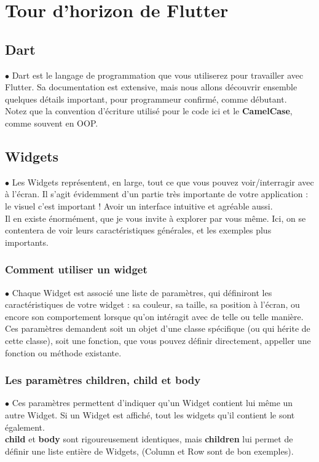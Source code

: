 \section{Tour d'horizon de Flutter}

\subsection{Dart}
\par $\bullet$ Dart est le langage de programmation que vous utiliserez pour travailler avec Flutter. Sa documentation est extensive, mais nous allons découvrir ensemble quelques détails important, pour programmeur confirmé, comme débutant.\\
Notez que la convention d'écriture utilisé pour le code ici et le \textbf{CamelCase}, comme souvent en OOP.

\subsection{Widgets}
\par $\bullet$ Les Widgets représentent, en large, tout ce que vous pouvez voir/interragir avec à l'écran. Il s'agit évidemment d'un partie très  importante de votre application : le visuel c'est important ! Avoir un interface intuitive et agréable aussi.\\
Il en existe énormément, que je vous invite à explorer par vous même. Ici, on se contentera de voir leurs caractéristiques générales, et les exemples plus importants.

\subsubsection{Comment utiliser un widget}
\par $\bullet$ Chaque Widget est associé une liste de paramètres, qui définiront les caractéristiques de votre widget : sa couleur, sa taille, sa position à l'écran, ou encore son comportement lorsque qu'on intéragit avec de telle ou telle manière.\\
Ces paramètres demandent soit un objet d'une classe spécifique (ou qui hérite de cette classe), soit une fonction, que vous pouvez définir directement, appeller une fonction ou méthode existante.

\subsubsection{Les paramètres children, child et body}
\par $\bullet$ Ces paramètres permettent d'indiquer qu'un Widget contient lui même un autre Widget. Si un Widget est affiché, tout les widgets qu'il contient le sont également.\\
\textbf{child} et \textbf{body} sont rigoureusement identiques, mais \textbf{children} lui permet de définir une liste entière de Widgets, (Column et Row sont de bon exemples).


